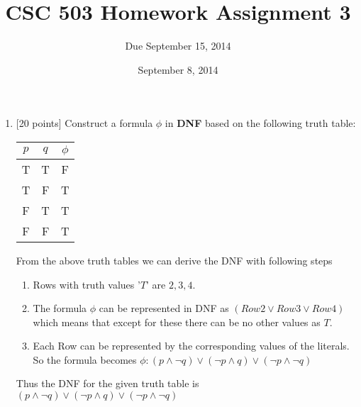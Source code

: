 \documentclass{article}
\title{CSC 503 Homework Assignment 3}
\author{Due September 15, 2014}
\date{September 8, 2014}
\begin{document}
\maketitle

\begin{enumerate}

\item {[20 points]} Construct a formula $\phi$ in \textbf{DNF} based on
  the following truth table:
  \begin{center}
    \begin{tabular}{cc|c}
      $p$ & $q$ & $\phi$ \\ \hline
      T & T & F \\
      T & F & T \\
      F & T & T \\
      F & F & T \\
    \end{tabular}
  \end{center}
  \begin{answer}
  	From the above truth tables we can derive the DNF with following steps
  	\begin{enumerate}
  	  \item Rows with truth values '$T$' are $2, 3, 4$.
  	  \item The formula $\phi$ can be represented in DNF as $(Row2 \lor Row3 \lor
  	  Row4)$ which means that except for these there can be no other values as $T$.
  	  \item Each Row can be represented by the corresponding values of the
  	  literals. So the formula becomes $\phi : (p \land \neg q) \lor (\neg p
  	  \land q) \lor (\neg p \land \neg q)$
	\end{enumerate}
	
	Thus the DNF for the given truth table is $(p \land \neg q) \lor (\neg p
  	  \land q) \lor (\neg p \land \neg q)$
  \end{answer}


\end{enumerate}
\end{document}
